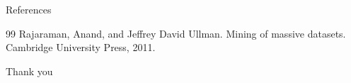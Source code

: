 \documentclass[15pt,t]{beamer}
\begin{document}
\begin{frame}[allowframebreaks]{References}
\tiny
\begin{thebibliography}{99}
	 Rajaraman, Anand, and Jeffrey David Ullman. Mining of massive datasets. Cambridge University Press, 2011.
	

	\end{thebibliography}
\end{frame}
	
\begin{frame}
\vspace*{3cm}
\begin{center}
\Huge {\Huge Thank you}
\end{center}
	
\end{frame}
\end{document}
